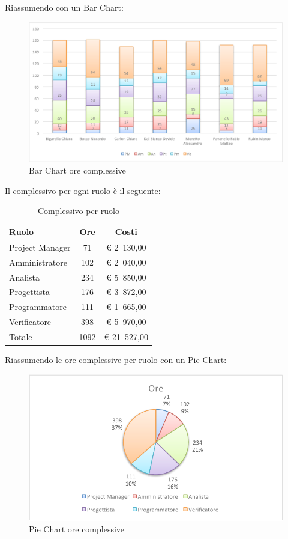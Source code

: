 				Riassumendo con un Bar Chart:
				\begin{figure}[H]\centering
					\includegraphics[width=\textwidth]{PianoDiProgetto/Pics/ChartOreTot.pdf}
					\caption{Bar Chart ore complessive}
				\end{figure}
				Il complessivo per ogni ruolo è il seguente:
				\begin{table}[H]
					\begin{center}
						\begin{tabular}{| l | c | c |}
							\hline
							Ruolo 				& Ore 	& Costi  \\ \hline
							
							Project Manager		& 71 	& \euro{} 2~130,00 	\\
							Amministratore 		& 102 	& \euro{} 2~040,00 	\\
							Analista	 		& 234 	& \euro{} 5~850,00 	\\
							Progettista 		& 176	& \euro{} 3~872,00 	\\
							Programmatore		& 111	& \euro{} 1~665,00	\\
							Verificatore		& 398 	& \euro{} 5~970,00 	\\ \hline \hline
							
							Totale	 			& 1092 	& \euro{} 21~527,00 	\\ \hline
						\end{tabular}
					\end{center}
					\caption{Complessivo per ruolo}
				\end{table}
				Riassumendo le ore complessive per ruolo con un Pie Chart:
				\begin{figure}[H]\centering
					\includegraphics[width=\textwidth]{PianoDiProgetto/Pics/ChartTotOre.pdf}
					\caption{Pie Chart ore complessive}
				\end{figure}
